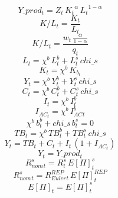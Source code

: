 \begin{dmath}
{Y\_prod_{t}}={Z_{t}}\, {K_{t}}^{{\alpha }}\, {L_{t}}^{1-{\alpha }}
\end{dmath}
\begin{dmath}
{K/L_{t}}=\frac{{K_{t}}}{{L_{t}}}
\end{dmath}
\begin{dmath}
{K/L_{t}}=\frac{{w_{t}}\, \frac{{\alpha }}{1-{\alpha }}}{{q_{t}}}
\end{dmath}
\begin{dmath}
{L_{t}}={\chi^b }\, {L^b_{t}}+{L^s_{t}}\, {chi\_s}
\end{dmath}
\begin{dmath}
{K_{t}}={\chi^b }\, {K_b_{t}}
\end{dmath}
\begin{dmath}
{Y_{t}}={\chi^b }\, {Y^b_{t}}+{Y^s_{t}}\, {chi\_s}
\end{dmath}
\begin{dmath}
{C_{t}}={\chi^b }\, {C^b_{t}}+{C^s_{t}}\, {chi\_s}
\end{dmath}
\begin{dmath}
{I_{t}}={\chi^b }\, {I^b_{t}}
\end{dmath}
\begin{dmath}
{I_{AC}_{t}}={\chi^b }\, {I_{AC}^b_{t}}
\end{dmath}
\begin{dmath}
{\chi^b }\, {b^b_{t}}+{chi\_s}\, {b^s_{t}}=0
\end{dmath}
\begin{dmath}
{TB_{t}}={\chi^b }\, {TB^b_{t}}+{TB^s_{t}}\, {chi\_s}
\end{dmath}
\begin{dmath}
{Y_{t}}={TB_{t}}+{C_{t}}+{I_{t}}\, \left(1+{I_{AC}_{t}}\right)
\end{dmath}
\begin{dmath}
{Y_{t}}={Y\_prod_{t}}
\end{dmath}
\begin{dmath}
{ R^s_{nom}_{t}}={R^s_{t}}\, { E[\Pi]^{s} _{t}}
\end{dmath}
\begin{dmath}
{ R^s_{nom}_{t}}={ R^{REP}_{Euler} _{t}}\, { E[\Pi]^{REP} _{t}}
\end{dmath}
\begin{dmath}
{ E[\Pi] _{t}}={ E[\Pi]^{s} _{t}}
\end{dmath}

